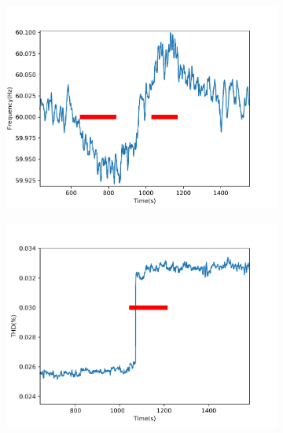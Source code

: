 \begin{figure}[ht!]
    \centering
    \begin{subfigure}{0.5\textwidth}
        \centering
        \includegraphics[width=1\linewidth]{img/napali_eval/napali_live_f.pdf}
        \caption{}
        \label{fig:expdes:7:1}
    \end{subfigure}%
    \begin{subfigure}{0.5\textwidth}
        \centering
        \includegraphics[width=1\linewidth]{img/napali_eval/napali_live_thd.pdf}
        \caption{}
        \label{fig:expdes:7:2}
    \end{subfigure}


\end{figure}

